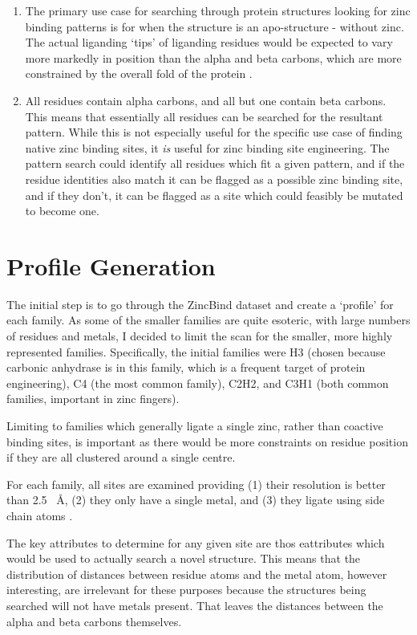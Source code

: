\begin{enumerate}
   \item The primary use case for searching through protein structures looking for zinc binding patterns is for when the structure is an apo-structure - without zinc. The actual liganding `tips' of liganding residues would be expected to vary more markedly in position than the alpha and beta carbons, which are more constrained by the overall fold of the protein .
   \item All residues contain alpha carbons, and all but one contain beta carbons. This means that essentially all residues can be searched for the resultant pattern. While this is not especially useful for the specific use case of finding native zinc binding sites, it \emph{is} useful for zinc binding site engineering. The pattern search could identify all residues which fit a given pattern, and if the residue identities also match it can be flagged as a possible zinc binding site, and if they don't, it can be flagged as a site which could feasibly be mutated to become one.
\end{enumerate}

\section{Profile Generation}

The initial step is to go through the ZincBind dataset and create a `profile' for each family. As some of the smaller families are quite esoteric, with large numbers of residues and metals, I decided to limit the scan for the smaller, more highly represented families. Specifically, the initial families were H3 (chosen because carbonic anhydrase is in this family, which is a frequent target of protein engineering), C4 (the most common family), C2H2, and C3H1 (both common families, important in zinc fingers).

Limiting to families which generally ligate a single zinc, rather than coactive binding sites, is important as there would be more constraints on residue position if they are all clustered around a single centre.

For each family, all sites are examined providing (1) their resolution is better than 2.5 ~{\AA}, (2) they only have a single metal, and (3) they ligate using side chain atoms .

The key attributes to determine for any given site are thos eattributes which would be used to actually search a novel structure. This means that the distribution of distances between residue atoms and the metal atom, however interesting, are irrelevant for these purposes because the structures being searched will not have metals present. That leaves the distances between the alpha and beta carbons themselves.

